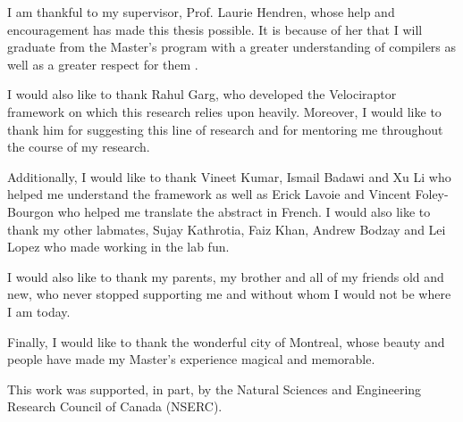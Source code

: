 I am thankful to my supervisor, Prof. Laurie Hendren, whose help and encouragement has made this thesis possible. It is because of her that I will graduate from the Master's program with a greater understanding  of compilers as well as a greater respect for them . 

I would also like to thank Rahul Garg, who developed the Velociraptor framework on which this research relies upon heavily. Moreover, I would like to thank him for suggesting this line of research and for mentoring me throughout the course of my research. 

Additionally, I would like to thank Vineet Kumar, Ismail Badawi and Xu Li who helped me understand the \mclab framework as well as Erick Lavoie and Vincent Foley-Bourgon who helped me translate the abstract in French. I would also like to thank my other labmates, Sujay Kathrotia, Faiz Khan, Andrew Bodzay and Lei Lopez who made working in the lab fun. 

I would also like to thank my parents, my brother and all of my friends old and new, who never stopped supporting me and without whom I would not be where I am today.

Finally, I would like to thank the wonderful city of Montreal, whose beauty and people have made my Master's experience magical and memorable. 

This work was supported, in part, by the Natural Sciences and Engineering Research
Council of Canada (NSERC).
